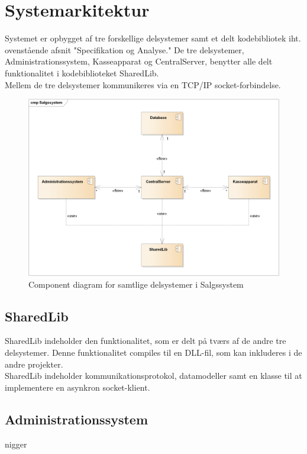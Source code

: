 \section{Systemarkitektur}

Systemet er opbygget af tre forskellige delsystemer samt et delt kodebibliotek iht. ovenstående afsnit "Specifikation og Analyse." De tre delsystemer, Administrationssystem, Kasseapparat og CentralServer, benytter alle delt funktionalitet i kodebiblioteket SharedLib.\\

Mellem de tre delsystemer kommunikeres via en TCP/IP socket-forbindelse.


\begin{figure}[H]
    \centering
    \includegraphics[width=1\textwidth]{Projektbeskrivelse/Systemarkitektur/Components.png}
    \caption{Component diagram for samtlige delsystemer i Salgssystem}
    \label{fig:CSLogging}
\end{figure}



\subsection{SharedLib}
SharedLib indeholder den funktionalitet, som er delt på tværs af de andre tre delsystemer. Denne funktionalitet compiles til en DLL-fil, som kan inkluderes i de andre projekter.\\

SharedLib indeholder kommunikationsprotokol, datamodeller samt en klasse til at implementere en asynkron socket-klient.


\subsection{Administrationssystem}
nigger


